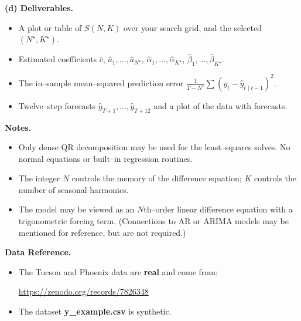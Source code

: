 \begin{problem}
\medskip
\textbf{(d) Deliverables.}
\begin{itemize}
  \item A plot or table of $S(N,K)$ over your search grid, and the selected
        $(N^\star,K^\star)$.
  \item Estimated coefficients
        $\hat c$, $\hat a_1,\dots,\hat a_{N^\star}$,
        $\hat\alpha_1,\dots,\hat\alpha_{K^\star}$,
        $\hat\beta_1,\dots,\hat\beta_{K^\star}$.
  \item The in--sample mean--squared prediction error
        $\frac{1}{T-N^\star}\sum (y_t-\widehat y_{t\mid t-1})^2$.
  \item Twelve--step forecasts
        $\widehat y_{T+1},\dots,\widehat y_{T+12}$ and a plot of the data with forecasts.
\end{itemize}

\medskip
\textbf{Notes.}
\begin{itemize}
  \item Only dense QR decomposition may be used for the least--squares solves.
        No normal equations or built--in regression routines.
  \item The integer $N$ controls the memory of the difference equation;
        $K$ controls the number of seasonal harmonics.
  \item The model may be viewed as an $N$th--order linear difference equation
        with a trigonometric forcing term.
        (Connections to AR or ARIMA models may be mentioned for reference,
        but are not required.)
\end{itemize}
\end{problem}

\medskip
\textbf{Data Reference.}
\begin{itemize}
\item The Tucson and Phoenix data are \textbf{real} and come from:
  \begin{center}
    \url{https://zenodo.org/records/7826348}
  \end{center}
\item The dataset \textbf{y\_example.csv} is synthetic.
\end{itemize}
